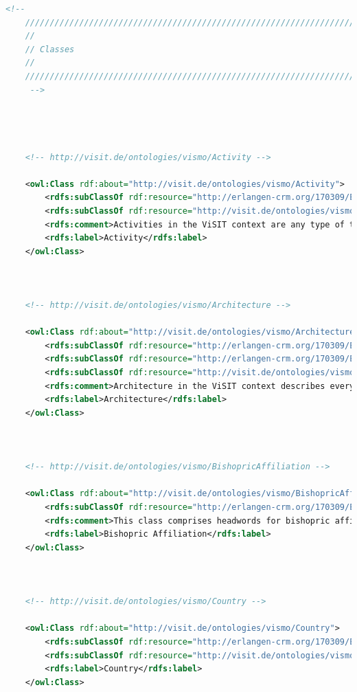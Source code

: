 \begin{lstlisting}[caption={VisMo Ontologie in der letzten (englischen) Version.},label={lst:vismo},captionpos=b,language=xml]
    <!-- 
    ///////////////////////////////////////////////////////////////////////////////////////
    //
    // Classes
    //
    ///////////////////////////////////////////////////////////////////////////////////////
     -->

    


    <!-- http://visit.de/ontologies/vismo/Activity -->

    <owl:Class rdf:about="http://visit.de/ontologies/vismo/Activity">
        <rdfs:subClassOf rdf:resource="http://erlangen-crm.org/170309/E7_Activity"/>
        <rdfs:subClassOf rdf:resource="http://visit.de/ontologies/vismo/Resource"/>
        <rdfs:comment>Activities in the ViSIT context are any type of timely historical event that can contribute a timely frame for associated ViSIT concepts. For example &quot;World War II&quot;, &quot;The battle for town x&quot;, etc.</rdfs:comment>
        <rdfs:label>Activity</rdfs:label>
    </owl:Class>
    


    <!-- http://visit.de/ontologies/vismo/Architecture -->

    <owl:Class rdf:about="http://visit.de/ontologies/vismo/Architecture">
        <rdfs:subClassOf rdf:resource="http://erlangen-crm.org/170309/E53_Place"/>
        <rdfs:subClassOf rdf:resource="http://erlangen-crm.org/170309/E84_Information_Carrier"/>
        <rdfs:subClassOf rdf:resource="http://visit.de/ontologies/vismo/Resource"/>
        <rdfs:comment>Architecture in the ViSIT context describes every building or architectural production that has been erected by mankind in some way.</rdfs:comment>
        <rdfs:label>Architecture</rdfs:label>
    </owl:Class>
    


    <!-- http://visit.de/ontologies/vismo/BishopricAffiliation -->

    <owl:Class rdf:about="http://visit.de/ontologies/vismo/BishopricAffiliation">
        <rdfs:subClassOf rdf:resource="http://erlangen-crm.org/170309/E55_Type"/>
        <rdfs:comment>This class comprises headwords for bishopric affiliations for vismo:Architecture resources.</rdfs:comment>
        <rdfs:label>Bishopric Affiliation</rdfs:label>
    </owl:Class>
    


    <!-- http://visit.de/ontologies/vismo/Country -->

    <owl:Class rdf:about="http://visit.de/ontologies/vismo/Country">
        <rdfs:subClassOf rdf:resource="http://erlangen-crm.org/170309/E53_Place"/>
        <rdfs:subClassOf rdf:resource="http://visit.de/ontologies/vismo/Resource"/>
        <rdfs:label>Country</rdfs:label>
    </owl:Class>
    



\end{lstlisting}
